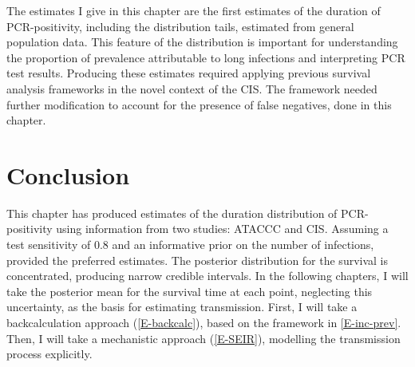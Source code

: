 \documentclass[thesis.tex]{subfiles}
\begin{document}
The estimates I give in this chapter are the first estimates of the duration of PCR-positivity, including the distribution tails, estimated from general population data.
This feature of the distribution is important for understanding the proportion of prevalence attributable to long infections and interpreting PCR test results.
Producing these estimates required applying previous survival analysis frameworks in the novel context of the CIS.
The framework needed further modification to account for the presence of false negatives, done in this chapter.

\section{Conclusion} \label{imperf-test:sec:conclusion}

This chapter has produced estimates of the duration distribution of PCR-positivity using information from two studies: ATACCC and CIS.
Assuming a test sensitivity of 0.8 and an informative prior on the number of infections, provided the preferred estimates.
The posterior distribution for the survival is concentrated, producing narrow credible intervals.
In the following chapters, I will take the posterior mean for the survival time at each point, neglecting this uncertainty, as the basis for estimating transmission.
First, I will take a backcalculation approach (\cref{E-backcalc}), based on the framework in \cref{E-inc-prev}.
Then, I will take a mechanistic approach (\cref{E-SEIR}), modelling the transmission process explicitly.

\ifSubfilesClassLoaded{
  \listoftodos
}{}
\end{document}
